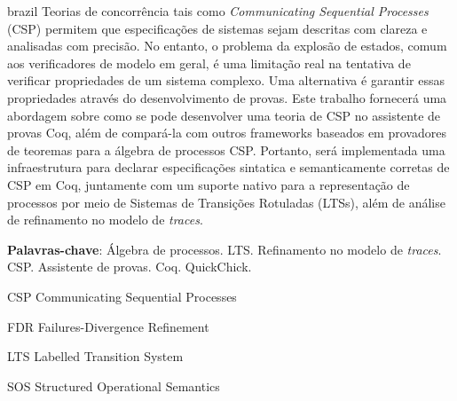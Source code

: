 \documentclass[
	12pt,				%
	a4paper,			%
	oneside,
	english,			%
	brazil				%
	]{abntex2}
\begin{document}
\begin{resumo}[Resumo]
 \begin{otherlanguage*}{brazil}
   Teorias de concorrência tais como \emph{Communicating Sequential Processes} (CSP) permitem que especificações de sistemas sejam descritas com clareza e analisadas com precisão. No entanto, o problema da explosão de estados, comum aos verificadores de modelo em geral, é uma limitação real na tentativa de verificar propriedades de um sistema complexo. Uma alternativa é garantir essas propriedades através do desenvolvimento de provas. Este trabalho fornecerá uma abordagem sobre como se pode desenvolver uma teoria de CSP no assistente de provas Coq, além de compará-la com outros frameworks baseados em provadores de teoremas para  a álgebra de processos CSP. Portanto, será implementada uma infraestrutura para declarar especificações sintatica e semanticamente corretas de CSP em Coq, juntamente com um suporte nativo para a representação de processos por meio de Sistemas de Transições Rotuladas (LTSs), além de análise de refinamento no modelo de \emph{traces}.
    
   \textbf{Palavras-chave}: Álgebra de processos. LTS. Refinamento no modelo de \emph{traces}. CSP. Assistente de provas. Coq. QuickChick.
 \end{otherlanguage*}
\end{resumo}

\listoffigures*
\cleardoublepage

\begin{siglas}
	\item[CSP] Communicating Sequential Processes
	\item[FDR] Failures-Divergence Refinement
	\item[LTS] Labelled Transition System
	\item[SOS] Structured Operational Semantics
\end{siglas}

\tableofcontents*
\cleardoublepage


\textual









\postextual


\end{document}
